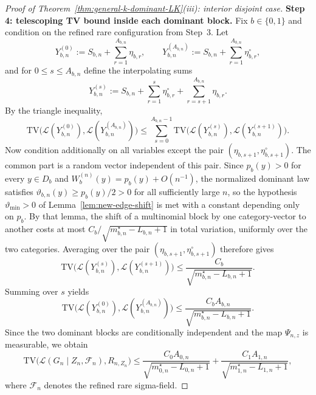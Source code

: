 \documentclass{article}
\newcommand{\TV}{\mathrm{TV}}
\newcommand{\1}{\mathbf 1}
\begin{document}
\begin{proof}[Proof of Theorem~\ref{thm:general-k-dominant-LK}(iii): interior disjoint case]
\medskip
\textbf{Step 4: telescoping TV bound inside each dominant block.}
Fix $b\in\{0,1\}$ and condition on the refined rare configuration from Step~3. Let
\[
Y_{b,n}^{(0)}:=S_{b,n}+\sum_{r=1}^{A_{b,n}}\eta_{b,r},
\qquad
Y_{b,n}^{(A_{b,n})}:=S_{b,n}+\sum_{r=1}^{A_{b,n}}\eta_{b,r}^\circ,
\]
and for $0\le s\le A_{b,n}$ define the interpolating sums
\[
Y_{b,n}^{(s)}:=S_{b,n}+\sum_{r=1}^{s}\eta_{b,r}^\circ+\sum_{r=s+1}^{A_{b,n}}\eta_{b,r}.
\]
By the triangle inequality,
\[
\TV\bigl(\mathcal L(Y_{b,n}^{(0)}),\mathcal L(Y_{b,n}^{(A_{b,n})})\bigr)
\le \sum_{s=0}^{A_{b,n}-1}
\TV\bigl(\mathcal L(Y_{b,n}^{(s)}),\mathcal L(Y_{b,n}^{(s+1)})\bigr).
\]
Now condition additionally on all variables except the pair $(\eta_{b,s+1},\eta_{b,s+1}^\circ)$. The common part is a
random vector independent of this pair. Since $p_b(y)>0$ for every $y\in D_b$ and $W_b^{(n)}(y)=p_b(y)+O(n^{-1})$, the normalized dominant law satisfies $\vartheta_{b,n}(y)\ge p_b(y)/2>0$ for all sufficiently large $n$, so the hypothesis $\vartheta_{\min}>0$ of Lemma~\ref{lem:new-edge-shift} is met with a constant depending only on $p_b$. By that lemma, the shift of a
multinomial block by one category-vector to another costs at most $C_b/\sqrt{m_{b,n}^\star-L_{b,n}+1}$ in total
variation, uniformly over the two categories. Averaging over the pair
$(\eta_{b,s+1},\eta_{b,s+1}^\circ)$ therefore gives
\[
\TV\bigl(\mathcal L(Y_{b,n}^{(s)}),\mathcal L(Y_{b,n}^{(s+1)})\bigr)
\le \frac{C_b}{\sqrt{m_{b,n}^\star-L_{b,n}+1}}.
\]
Summing over $s$ yields
\[
\TV\bigl(\mathcal L(Y_{b,n}^{(0)}),\mathcal L(Y_{b,n}^{(A_{b,n})})\bigr)
\le \frac{C_bA_{b,n}}{\sqrt{m_{b,n}^\star-L_{b,n}+1}}.
\]
Since the two dominant blocks are conditionally independent and the map $\Psi_{n,z}$ is measurable, we obtain
\[
\TV\bigl(\mathcal L(G_n\mid Z_n,\mathcal F_n),R_{n,Z_n}\bigr)
\le
\frac{C_0A_{0,n}}{\sqrt{m_{0,n}^\star-L_{0,n}+1}}
+
\frac{C_1A_{1,n}}{\sqrt{m_{1,n}^\star-L_{1,n}+1}},
\]
where $\mathcal F_n$ denotes the refined rare sigma-field.


\end{proof}
\end{document}
